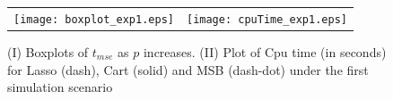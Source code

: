 \documentclass{article} %
\providecommand{\mc}[1]{\mathcal{#1}}
\begin{document}
%
%
%
\begin{figure}
\centering
\begin{tabular}{ll}
\texttt{[image: boxplot\_exp1.eps]} &\texttt{[image: cpuTime\_exp1.eps]}

\end{tabular}
\caption{(I) Boxplots of $t_{mse}$ as $p$ increases. (II) Plot of Cpu time (in seconds) for Lasso (dash), Cart (solid) and MSB (dash-dot) under the first simulation scenario} \label{{boxplot:linear}}

\end{figure}
\end{document}
